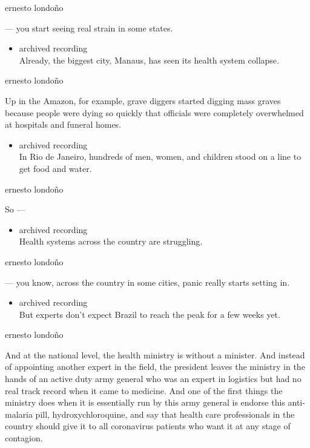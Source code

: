 ernesto londoño

--- you start seeing real strain in some states.

\begin{itemize}
\tightlist
\item
  archived recording\\
  Already, the biggest city, Manaus, has seen its health system
  collapse.
\end{itemize}

ernesto londoño

Up in the Amazon, for example, grave diggers started digging mass graves
because people were dying so quickly that officials were completely
overwhelmed at hospitals and funeral homes.

\begin{itemize}
\tightlist
\item
  archived recording\\
  In Rio de Janeiro, hundreds of men, women, and children stood on a
  line to get food and water.
\end{itemize}

ernesto londoño

So ---

\begin{itemize}
\tightlist
\item
  archived recording\\
  Health systems across the country are struggling.
\end{itemize}

ernesto londoño

--- you know, across the country in some cities, panic really starts
setting in.

\begin{itemize}
\tightlist
\item
  archived recording\\
  But experts don't expect Brazil to reach the peak for a few weeks yet.
\end{itemize}

ernesto londoño

And at the national level, the health ministry is without a minister.
And instead of appointing another expert in the field, the president
leaves the ministry in the hands of an active duty army general who was
an expert in logistics but had no real track record when it came to
medicine. And one of the first things the ministry does when it is
essentially run by this army general is endorse this anti-malaria pill,
hydroxychloroquine, and say that health care professionals in the
country should give it to all coronavirus patients who want it at any
stage of contagion.

